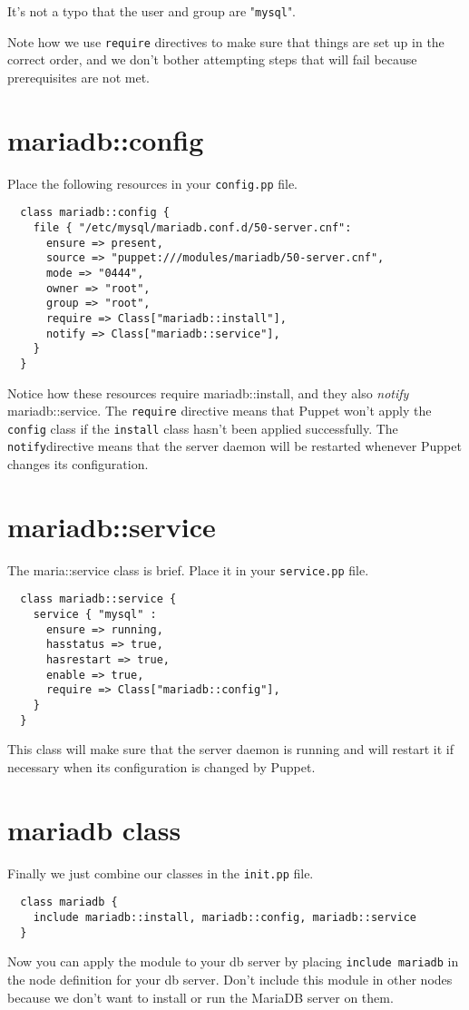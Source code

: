 \documentclass{article}   	%
\begin{document}
It's not a typo that the user and group are "\texttt{mysql}".

Note how we use \texttt{require} directives to make sure that things are set up in the correct order, and we don't bother attempting steps that will fail because prerequisites are not met.



\section{mariadb::config}
Place the following resources in your \texttt{config.pp} file.

\begin{verbatim}
  class mariadb::config {
    file { "/etc/mysql/mariadb.conf.d/50-server.cnf":
      ensure => present,
      source => "puppet:///modules/mariadb/50-server.cnf",
      mode => "0444",
      owner => "root",
      group => "root",
      require => Class["mariadb::install"],
      notify => Class["mariadb::service"],
    }
  }
\end{verbatim}

Notice how these resources require mariadb::install, and they also \emph{notify} mariadb::service.  The \texttt{require} directive means that Puppet won't apply the \texttt{config} class if the \texttt{install} class hasn't been applied successfully. The \texttt{notify}directive means that the server daemon will be restarted whenever Puppet changes its configuration.

\section{mariadb::service}
The maria::service class is brief.  Place it in your \texttt{service.pp} file.

\begin{verbatim}
  class mariadb::service {
    service { "mysql" :
      ensure => running,
      hasstatus => true,
      hasrestart => true,
      enable => true,
      require => Class["mariadb::config"],
    }
  }
\end{verbatim}

This class will make sure that the server daemon is running and will restart it if necessary when its configuration is changed by Puppet.

\section{mariadb class}

Finally we just combine our classes in the \texttt{init.pp} file.

\begin{verbatim}
  class mariadb {
    include mariadb::install, mariadb::config, mariadb::service
  }
\end{verbatim}

Now you can apply the module to your db server by placing \texttt{include mariadb} in the node definition for your db server. Don't include this module in other nodes because we don't want to install or run the MariaDB server on them.
\end{document}
